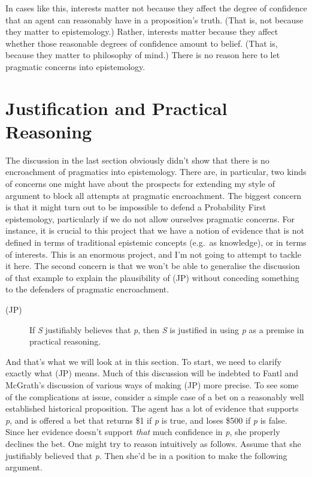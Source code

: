 \documentclass[
  11pt,
  letterpaper,
  DIV=11,
  numbers=noendperiod,
  oneside]{scrartcl}
\begin{document}
In cases like this, interests matter not because they affect the degree
of confidence that an agent can reasonably have in a proposition's
truth. (That is, not because they matter to epistemology.) Rather,
interests matter because they affect whether those reasonable degrees of
confidence amount to belief. (That is, because they matter to philosophy
of mind.) There is no reason here to let pragmatic concerns into
epistemology.

\section{Justification and Practical
Reasoning}\label{justification-and-practical-reasoning}

The discussion in the last section obviously didn't show that there is
no encroachment of pragmatics into epistemology. There are, in
particular, two kinds of concerns one might have about the prospects for
extending my style of argument to block all attempts at pragmatic
encroachment. The biggest concern is that it might turn out to be
impossible to defend a Probability First epistemology, particularly if
we do not allow ourselves pragmatic concerns. For instance, it is
crucial to this project that we have a notion of evidence that is not
defined in terms of traditional epistemic concepts (e.g.~as knowledge),
or in terms of interests. This is an enormous project, and I'm not going
to attempt to tackle it here. The second concern is that we won't be
able to generalise the discussion of that example to explain the
plausibility of (JP) without conceding something to the defenders of
pragmatic encroachment.

\begin{description}
\item[(JP)]
If \emph{S} justifiably believes that \emph{p}, then \emph{S} is
justified in using \emph{p} as a premise in practical reasoning.
\end{description}

And that's what we will look at in this section. To start, we need to
clarify exactly what (JP) means. Much of this discussion will be
indebted to Fantl and McGrath's discussion of various ways of making
(JP) more precise. To see some of the complications at issue, consider a
simple case of a bet on a reasonably well established historical
proposition. The agent has a lot of evidence that supports \emph{p}, and
is offered a bet that returns \$1 if \emph{p} is true, and loses \$500
if \emph{p} is false. Since her evidence doesn't support \emph{that}
much confidence in \emph{p}, she properly declines the bet. One might
try to reason intuitively as follows. Assume that she justifiably
believed that \emph{p}. Then she'd be in a position to make the
following argument.
\end{document}
